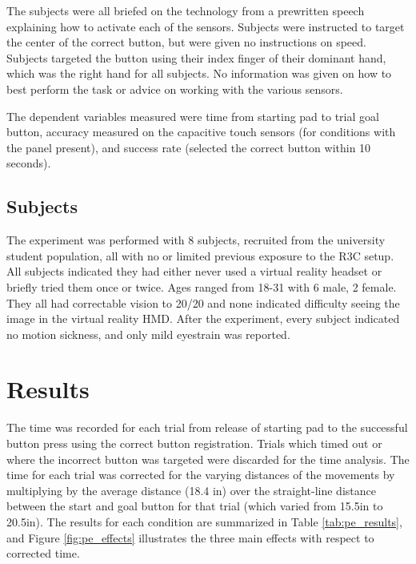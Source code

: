 The subjects were all briefed on the technology from a prewritten speech explaining how to activate each of the sensors.
Subjects were instructed to target the center of the correct button, but were given no instructions on speed.
Subjects targeted the button using their index finger of their dominant hand, which was the right hand for all subjects.
No information was given on how to best perform the task or advice on working with the various sensors.

The dependent variables measured were time from starting pad to trial goal button, accuracy measured on the capacitive touch sensors (for conditions with the panel present), and success rate (selected the correct button within 10 seconds).


\subsection{Subjects}
The experiment was performed with 8 subjects, recruited from the university student population, all with no or limited previous exposure to the R3C setup.
All subjects indicated they had either never used a virtual reality headset or briefly tried them once or twice.
Ages ranged from 18-31 with 6 male, 2 female.
They all had correctable vision to 20/20 and none indicated difficulty seeing the image in the virtual reality HMD.
After the experiment, every subject indicated no motion sickness, and only mild eyestrain was reported.

\section{Results}

The time was recorded for each trial from release of starting pad to the successful button press using the correct button registration.
Trials which timed out or where the incorrect button was targeted were discarded for the time analysis.
The time for each trial was corrected for the varying distances of the movements by multiplying by the average distance (18.4 in) over the straight-line distance between the start and goal button for that trial (which varied from 15.5in to 20.5in).
The results for each condition are summarized in Table \ref{tab:pe_results}, and Figure \ref{fig:pe_effects} illustrates the three main effects with respect to corrected time.

